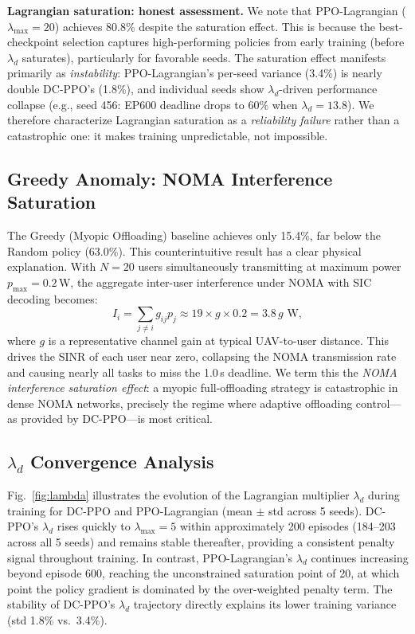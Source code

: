 \documentclass[journal]{IEEEtran}
\newcommand{\ld}{\lambda_d}
\begin{document}
\textbf{Lagrangian saturation: honest assessment.}
We note that PPO-Lagrangian ($\lambda_{\max}{=}20$) achieves
80.8\% despite the saturation effect.
This is because the best-checkpoint selection captures
high-performing policies from early training (before $\ld$
saturates), particularly for favorable seeds.
The saturation effect manifests primarily as \emph{instability}:
PPO-Lagrangian's per-seed variance (3.4\%) is nearly double
DC-PPO's (1.8\%), and individual seeds show $\ld$-driven
performance collapse (e.g., seed 456: EP600 deadline drops
to 60\% when $\ld{=}13.8$).
We therefore characterize Lagrangian saturation as a
\emph{reliability failure} rather than a catastrophic one:
it makes training unpredictable, not impossible.

\subsection{Greedy Anomaly: NOMA Interference Saturation}
\label{sec:greedy}

The Greedy (Myopic Offloading) baseline achieves only 15.4\%,
far below the Random policy (63.0\%).
This counterintuitive result has a clear physical explanation.
With $N{=}20$ users simultaneously transmitting at maximum power
$p_{\max}{=}0.2$\,W, the aggregate inter-user interference
under NOMA with SIC decoding becomes:
\begin{equation}
  I_i = \sum_{j \neq i} g_{ij} p_j \approx 19 \times g \times 0.2
      = 3.8\,g \text{ W},
\end{equation}
where $g$ is a representative channel gain at typical
UAV-to-user distance.
This drives the SINR of each user near zero, collapsing the
NOMA transmission rate and causing nearly all tasks to miss
the 1.0\,s deadline.
We term this the \emph{NOMA interference saturation effect}:
a myopic full-offloading strategy is catastrophic in
dense NOMA networks, precisely the regime where
adaptive offloading control—as provided by DC-PPO—is most critical.

\subsection{$\lambda_d$ Convergence Analysis}

Fig.~\ref{fig:lambda} illustrates the evolution of the Lagrangian
multiplier $\ld$ during training for DC-PPO and PPO-Lagrangian
(mean $\pm$ std across 5 seeds).
DC-PPO's $\ld$ rises quickly to $\lambda_{\max}{=}5$ within
approximately 200 episodes (184--203 across all 5 seeds)
and remains stable thereafter,
providing a consistent penalty signal throughout training.
In contrast, PPO-Lagrangian's $\ld$ continues increasing beyond
episode 600, reaching the unconstrained saturation point of 20,
at which point the policy gradient is dominated by the
over-weighted penalty term.
The stability of DC-PPO's $\ld$ trajectory directly explains
its lower training variance (std 1.8\% vs.\ 3.4\%).
\end{document}
